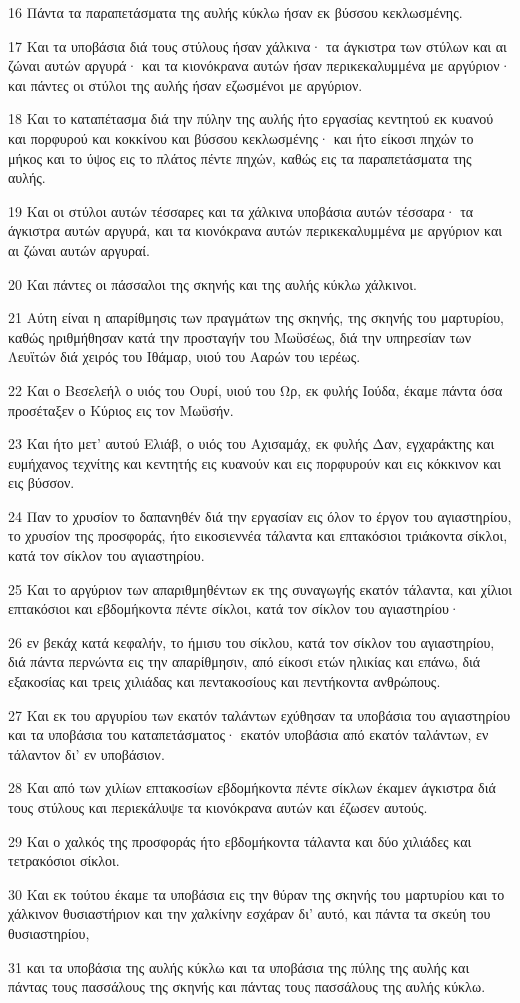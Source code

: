 \par 16 Πάντα τα παραπετάσματα της αυλής κύκλω ήσαν εκ βύσσου κεκλωσμένης.
\par 17 Και τα υποβάσια διά τους στύλους ήσαν χάλκινα· τα άγκιστρα των στύλων και αι ζώναι αυτών αργυρά· και τα κιονόκρανα αυτών ήσαν περικεκαλυμμένα με αργύριον· και πάντες οι στύλοι της αυλής ήσαν εζωσμένοι με αργύριον.
\par 18 Και το καταπέτασμα διά την πύλην της αυλής ήτο εργασίας κεντητού εκ κυανού και πορφυρού και κοκκίνου και βύσσου κεκλωσμένης· και ήτο είκοσι πηχών το μήκος και το ύψος εις το πλάτος πέντε πηχών, καθώς εις τα παραπετάσματα της αυλής.
\par 19 Και οι στύλοι αυτών τέσσαρες και τα χάλκινα υποβάσια αυτών τέσσαρα· τα άγκιστρα αυτών αργυρά, και τα κιονόκρανα αυτών περικεκαλυμμένα με αργύριον και αι ζώναι αυτών αργυραί.
\par 20 Και πάντες οι πάσσαλοι της σκηνής και της αυλής κύκλω χάλκινοι.
\par 21 Αύτη είναι η απαρίθμησις των πραγμάτων της σκηνής, της σκηνής του μαρτυρίου, καθώς ηριθμήθησαν κατά την προσταγήν του Μωϋσέως, διά την υπηρεσίαν των Λευϊτών διά χειρός του Ιθάμαρ, υιού του Ααρών του ιερέως.
\par 22 Και ο Βεσελεήλ ο υιός του Ουρί, υιού του Ωρ, εκ φυλής Ιούδα, έκαμε πάντα όσα προσέταξεν ο Κύριος εις τον Μωϋσήν.
\par 23 Και ήτο μετ' αυτού Ελιάβ, ο υιός του Αχισαμάχ, εκ φυλής Δαν, εγχαράκτης και ευμήχανος τεχνίτης και κεντητής εις κυανούν και εις πορφυρούν και εις κόκκινον και εις βύσσον.
\par 24 Παν το χρυσίον το δαπανηθέν διά την εργασίαν εις όλον το έργον του αγιαστηρίου, το χρυσίον της προσφοράς, ήτο εικοσιεννέα τάλαντα και επτακόσιοι τριάκοντα σίκλοι, κατά τον σίκλον του αγιαστηρίου.
\par 25 Και το αργύριον των απαριθμηθέντων εκ της συναγωγής εκατόν τάλαντα, και χίλιοι επτακόσιοι και εβδομήκοντα πέντε σίκλοι, κατά τον σίκλον του αγιαστηρίου·
\par 26 εν βεκάχ κατά κεφαλήν, το ήμισυ του σίκλου, κατά τον σίκλον του αγιαστηρίου, διά πάντα περνώντα εις την απαρίθμησιν, από είκοσι ετών ηλικίας και επάνω, διά εξακοσίας και τρεις χιλιάδας και πεντακοσίους και πεντήκοντα ανθρώπους.
\par 27 Και εκ του αργυρίου των εκατόν ταλάντων εχύθησαν τα υποβάσια του αγιαστηρίου και τα υποβάσια του καταπετάσματος· εκατόν υποβάσια από εκατόν ταλάντων, εν τάλαντον δι' εν υποβάσιον.
\par 28 Και από των χιλίων επτακοσίων εβδομήκοντα πέντε σίκλων έκαμεν άγκιστρα διά τους στύλους και περιεκάλυψε τα κιονόκρανα αυτών και έζωσεν αυτούς.
\par 29 Και ο χαλκός της προσφοράς ήτο εβδομήκοντα τάλαντα και δύο χιλιάδες και τετρακόσιοι σίκλοι.
\par 30 Και εκ τούτου έκαμε τα υποβάσια εις την θύραν της σκηνής του μαρτυρίου και το χάλκινον θυσιαστήριον και την χαλκίνην εσχάραν δι' αυτό, και πάντα τα σκεύη του θυσιαστηρίου,
\par 31 και τα υποβάσια της αυλής κύκλω και τα υποβάσια της πύλης της αυλής και πάντας τους πασσάλους της σκηνής και πάντας τους πασσάλους της αυλής κύκλω.


